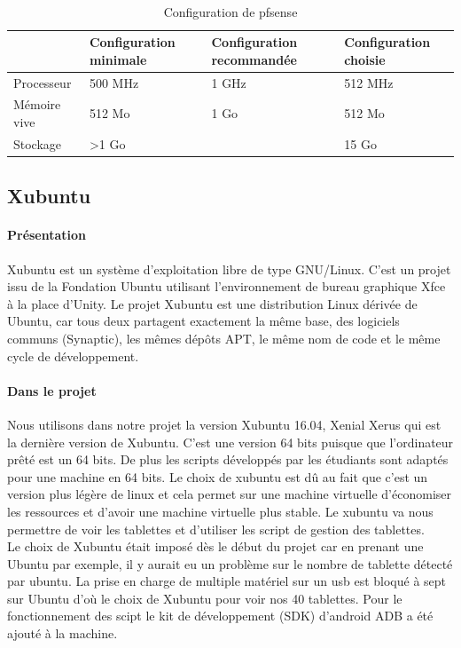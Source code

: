 \documentclass[a4paper,12pt]{extarticle}
\begin{document}
\paragraph{}
\begin{table}[!h]
\begin{tabular}{|p{3cm}|p{3cm}|p{3cm}|p{3cm}|}
\hline
 & Configuration minimale & Configuration recommandée & Configuration choisie\\
\hline 
Processeur & 500 MHz & 1 GHz & 512 MHz\\
\hline
Mémoire vive & 512 Mo & 1 Go & 512 Mo \\
\hline
Stockage & >1 Go & & 15 Go \\
\hline
\end{tabular}
\caption{Configuration de pfsense}
\end{table}


\subsection{Xubuntu}
\paragraph{Présentation\\}

Xubuntu est un système d'exploitation libre de type GNU/Linux. C'est un projet issu de la Fondation Ubuntu utilisant l'environnement de bureau graphique Xfce à la place d'Unity. Le projet Xubuntu est une distribution Linux dérivée de Ubuntu, car tous deux partagent exactement la même base, des logiciels communs (Synaptic), les mêmes dépôts APT, le même nom de code et le même cycle de développement.


\paragraph{Dans le projet\\}

Nous utilisons dans notre projet la version Xubuntu 16.04, Xenial Xerus qui est la dernière version de Xubuntu. C’est une version 64 bits puisque que l’ordinateur prêté est un 64 bits. De plus les scripts développés par les étudiants sont adaptés pour une machine en 64 bits.
Le choix de xubuntu est dû au fait que c’est un version plus légère de linux et cela permet sur une machine virtuelle d’économiser les ressources et d’avoir une machine virtuelle plus stable.
Le xubuntu va nous permettre de voir les tablettes et d’utiliser les script de gestion des tablettes. \\
Le choix de Xubuntu était imposé dès le début du projet car en prenant une Ubuntu par exemple, il y aurait eu  un problème sur le nombre de tablette détecté par ubuntu. La prise en charge de multiple matériel sur un usb est bloqué à sept sur Ubuntu d'où le choix de Xubuntu pour voir nos 40 tablettes. 
Pour le fonctionnement des scipt le kit de développement (SDK) d’android ADB a été ajouté à la machine.
\end{document}

